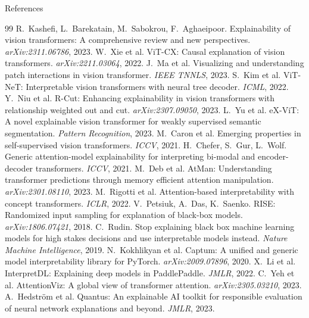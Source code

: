 \documentclass[10pt]{beamer}
\begin{document}
\begin{frame}[allowframebreaks]{References}
\tiny
\begin{thebibliography}{99}
\bibitem{} R.~Kashefi, L.~Barekatain, M.~Sabokrou, F.~Aghaeipoor. Explainability of vision transformers: A comprehensive review and new perspectives. \emph{arXiv:2311.06786}, 2023.
\bibitem{} W.~Xie et al. ViT-CX: Causal explanation of vision transformers. \emph{arXiv:2211.03064}, 2022.
\bibitem{} J.~Ma et al. Visualizing and understanding patch interactions in vision transformer. \emph{IEEE TNNLS}, 2023.
\bibitem{} S.~Kim et al. ViT-NeT: Interpretable vision transformers with neural tree decoder. \emph{ICML}, 2022.
\bibitem{} Y.~Niu et al. R-Cut: Enhancing explainability in vision transformers with relationship weighted out and cut. \emph{arXiv:2307.09050}, 2023.
\bibitem{} L.~Yu et al. eX-ViT: A novel explainable vision transformer for weakly supervised semantic segmentation. \emph{Pattern Recognition}, 2023.
\bibitem{} M.~Caron et al. Emerging properties in self-supervised vision transformers. \emph{ICCV}, 2021.
\bibitem{} H.~Chefer, S.~Gur, L.~Wolf. Generic attention-model explainability for interpreting bi-modal and encoder-decoder transformers. \emph{ICCV}, 2021.
\bibitem{} M.~Deb et al. AtMan: Understanding transformer predictions through memory efficient attention manipulation. \emph{arXiv:2301.08110}, 2023.
\bibitem{} M.~Rigotti et al. Attention-based interpretability with concept transformers. \emph{ICLR}, 2022.
\bibitem{} V.~Petsiuk, A.~Das, K.~Saenko. RISE: Randomized input sampling for explanation of black-box models. \emph{arXiv:1806.07421}, 2018.
\bibitem{} C.~Rudin. Stop explaining black box machine learning models for high stakes decisions and use interpretable models instead. \emph{Nature Machine Intelligence}, 2019.
\bibitem{} N.~Kokhlikyan et al. Captum: A unified and generic model interpretability library for PyTorch. \emph{arXiv:2009.07896}, 2020.
\bibitem{} X.~Li et al. InterpretDL: Explaining deep models in PaddlePaddle. \emph{JMLR}, 2022.
\bibitem{} C.~Yeh et al. AttentionViz: A global view of transformer attention. \emph{arXiv:2305.03210}, 2023.
\bibitem{} A.~Hedstr\"om et al. Quantus: An explainable AI toolkit for responsible evaluation of neural network explanations and beyond. \emph{JMLR}, 2023.
\end{thebibliography}
\end{frame}

\begin{frame}[plain]
\end{frame}
\end{document}
